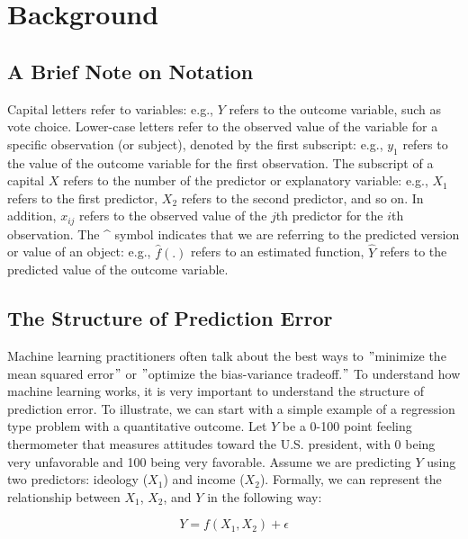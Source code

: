 \documentclass{book}
\begin{document}
\hypertarget{background-3}{%
\section{Background}\label{background-3}}

\hypertarget{a-brief-note-on-notation}{%
\subsection{A Brief Note on Notation}\label{a-brief-note-on-notation}}

Capital letters refer to variables: e.g., \(Y\) refers to the outcome
variable, such as vote choice. Lower-case letters refer to the observed value
of the variable for a specific observation (or subject), denoted by the first
subscript: e.g., \(y_{1}\) refers to the value of the outcome variable for the
first observation. The subscript of a capital \(X\) refers to the number of
the predictor or explanatory variable: e.g., \(X_{1}\) refers to the first
predictor, \(X_{2}\) refers to the second predictor, and so on. In addition,
\(x_{ij}\) refers to the observed value of the \(j\)th predictor for the
\(i\)th observation. The \^{} symbol indicates that we are referring to the
predicted version or value of an object: e.g., \(\hat{f}(.)\) refers to an
estimated function, \(\hat{Y}\) refers to the predicted value of the outcome
variable.

\hypertarget{the-structure-of-prediction-error}{%
\subsection{The Structure of Prediction
Error}\label{the-structure-of-prediction-error}}

Machine learning practitioners often talk about the best ways to \("\)minimize
the mean squared error\("\) or \("\)optimize the bias-variance tradeoff.\("\)
To understand how machine learning works, it is very important to understand
the structure of prediction error. To illustrate, we can start with a simple
example of a regression type problem with a quantitative outcome. Let \(Y\) be
a 0-100 point feeling thermometer that measures attitudes toward the U.S.
president, with 0 being very unfavorable and 100 being very favorable. Assume
we are predicting \(Y\) using two predictors: ideology (\(X_{1}\)) and income
(\(X_{2}\)). Formally, we can represent the relationship between \(X_{1}\),
\(X_{2}\), and \(Y\) in the following way:

\[Y=f \left( X_{1}, X_{2} \right) + \epsilon\]
\end{document}
